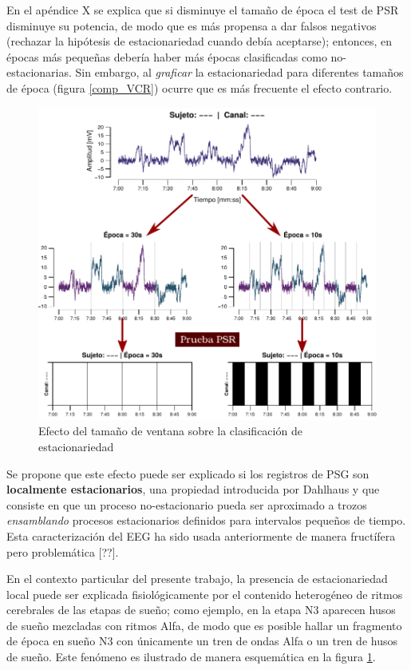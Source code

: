 En el apéndice X se explica que si disminuye el tamaño de época el test de PSR disminuye su 
potencia, de modo que es más propensa a dar falsos negativos (rechazar la hipótesis de 
estacionariedad cuando debía aceptarse); entonces, en épocas más pequeñas debería haber más épocas 
clasificadas como no-estacionarias.
Sin embargo, al \textit{graficar} la estacionariedad para diferentes tamaños de época (figura
\ref{comp_VCR}) ocurre que es más frecuente el efecto contrario.

\begin{figure}
\centering
\includegraphics[width=\linewidth]{./img_diagramas/epocas_diferentes_v2.pdf}
\caption{Efecto del tamaño de ventana sobre la clasificación de estacionariedad}
\label{epocas_diferentes}
\end{figure}

Se propone que este efecto puede ser explicado si los registros de PSG son \textbf{localmente
estacionarios}, una propiedad introducida por Dahlhaus \cite{Dahlhaus97} y que consiste en que un
proceso no-estacionario pueda ser aproximado a trozos \textit{ensamblando} procesos estacionarios
definidos para intervalos pequeños de tiempo.
Esta caracterización del EEG ha sido usada anteriormente de manera fructífera pero problemática
[??].

En el contexto particular del presente trabajo, la presencia de estacionariedad local puede ser
explicada fisiológicamente por el contenido heterogéneo de ritmos cerebrales de las etapas de 
sueño; como ejemplo, en la etapa N3 aparecen husos de sueño mezcladas con ritmos Alfa, de modo
que es posible hallar un fragmento de época en sueño N3 con únicamente un tren de ondas Alfa
o un tren de husos de sueño.
Este fenómeno es ilustrado de manera esquemática en la figura \ref{epocas_diferentes}.



